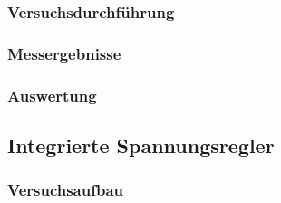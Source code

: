 \documentclass[12pt,a4paper]{article}
\begin{document}
\subsubsection{Versuchsdurchführung}

\subsubsection{Messergebnisse}
\subsubsection{Auswertung}
\subsection{Integrierte Spannungsregler}
\subsubsection{Versuchsaufbau}
\end{document}
